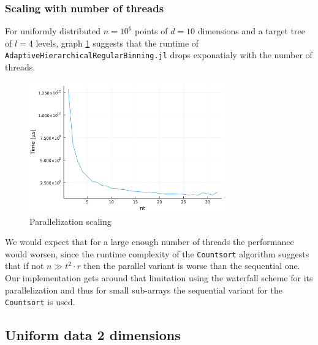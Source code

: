 \documentclass{juliacon}
\begin{document}


\subsubsection{Scaling with number of threads}
For uniformly distributed $n=10^6$ points of $d=10$ dimensions and a target tree of
$l=4$ levels, graph \ref{scale_t} suggests that the runtime of
\verb|AdaptiveHierarchicalRegularBinning.jl| drops exponatialy
with the number of threads.

\begin{figure}[!ht]
  \centerline{
    \includegraphics[width=20pc]{figures/experiments/scale_t.png}
  }
  \caption{ Parallelization scaling }
  \label{scale_t}
\end{figure}

We would expect that for a large enough number of threads the performance would worsen,
since the runtime complexity of the \verb|Countsort| algorithm suggests that if not
$n \gg t^2 \cdot r$ then the parallel variant is worse than the sequential one. Our
implementation gets around that limitation using the waterfall scheme for its
parallelization and thus for small sub-arrays the sequential variant for the
\verb|Countsort| is used.




\subsection{Uniform data 2 dimensions}
\end{document}
